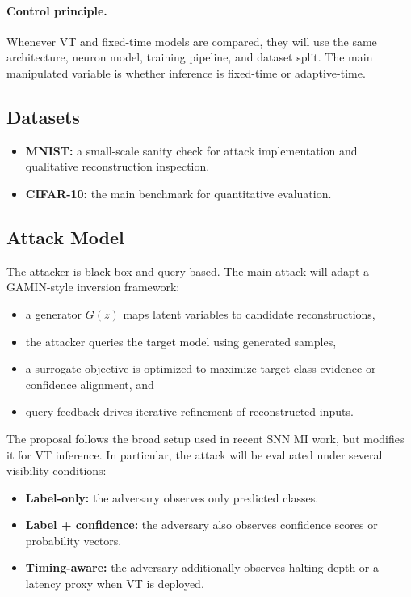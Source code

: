 \documentclass[11pt]{article}
\begin{document}
\paragraph{Control principle.}
Whenever VT and fixed-time models are compared, they will use the same architecture, neuron model, training pipeline, and dataset split. The main manipulated variable is whether inference is fixed-time or adaptive-time.

\subsection{Datasets}
\begin{itemize}[leftmargin=1.3em]
\item \textbf{MNIST:} a small-scale sanity check for attack implementation and qualitative reconstruction inspection.
\item \textbf{CIFAR-10:} the main benchmark for quantitative evaluation.
\end{itemize}

\subsection{Attack Model}
The attacker is black-box and query-based. The main attack will adapt a GAMIN-style inversion framework:
\begin{itemize}[leftmargin=1.3em]
\item a generator $G(z)$ maps latent variables to candidate reconstructions,
\item the attacker queries the target model using generated samples,
\item a surrogate objective is optimized to maximize target-class evidence or confidence alignment, and
\item query feedback drives iterative refinement of reconstructed inputs.
\end{itemize}

The proposal follows the broad setup used in recent SNN MI work, but modifies it for VT inference. In particular, the attack will be evaluated under several visibility conditions:
\begin{itemize}[leftmargin=1.3em]
\item \textbf{Label-only:} the adversary observes only predicted classes.
\item \textbf{Label + confidence:} the adversary also observes confidence scores or probability vectors.
\item \textbf{Timing-aware:} the adversary additionally observes halting depth or a latency proxy when VT is deployed.
\end{itemize}
\end{document}
